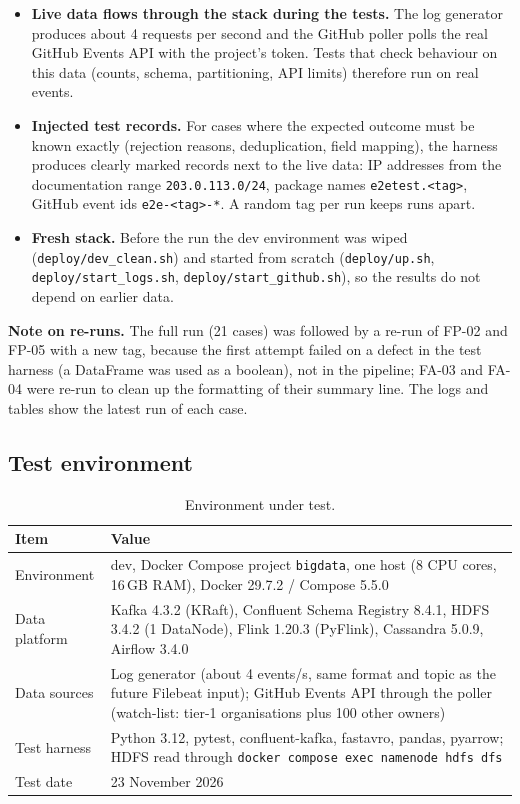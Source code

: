 \documentclass[11pt,a4paper]{article}
\begin{document}
\begin{itemize}
  \item \textbf{Live data flows through the stack during the tests.} The log generator produces about 4 requests per second and the GitHub poller
        polls the real GitHub Events API with the project's token. Tests that check behaviour on this data (counts, schema, partitioning, API limits)
        therefore run on real events.
  \item \textbf{Injected test records.} For cases where the expected outcome must be known exactly (rejection reasons, deduplication, field mapping),
        the harness produces clearly marked records next to the live data: IP addresses from the documentation range \texttt{203.0.113.0/24},
        package names \texttt{e2etest.<tag>}, GitHub event ids \texttt{e2e-<tag>-*}. A random tag per run keeps runs apart.
  \item \textbf{Fresh stack.} Before the run the dev environment was wiped (\texttt{deploy/dev\_clean.sh}) and started from scratch
        (\texttt{deploy/up.sh}, \texttt{deploy/start\_logs.sh}, \texttt{deploy/start\_github.sh}), so the results do not depend on earlier data.
\end{itemize}

\textbf{Note on re-runs.} The full run (21 cases) was followed by a re-run of FP-02 and FP-05 with a new tag, because the first attempt failed on a defect
in the test harness (a DataFrame was used as a boolean), not in the pipeline; FA-03 and FA-04 were re-run to clean up the formatting of their summary line.
The logs and tables show the latest run of each case.

\subsection{Test environment}

\begin{table}[H]
\centering
\caption{Environment under test.}
\small
\begin{tabularx}{\textwidth}{@{}L{4.2cm}Y@{}}
\toprule
\textbf{Item} & \textbf{Value} \\
\midrule
Environment & dev, Docker Compose project \texttt{bigdata}, one host (8 CPU cores, 16\,GB RAM), Docker 29.7.2 / Compose 5.5.0 \\
Data platform & Kafka 4.3.2 (KRaft), Confluent Schema Registry 8.4.1, HDFS 3.4.2 (1 DataNode), Flink 1.20.3 (PyFlink), Cassandra 5.0.9, Airflow 3.4.0 \\
Data sources & Log generator (about 4 events/s, same format and topic as the future Filebeat input); GitHub Events API through the poller (watch-list: tier-1 organisations plus 100 other owners) \\
Test harness & Python 3.12, pytest, confluent-kafka, fastavro, pandas, pyarrow; HDFS read through \texttt{docker compose exec namenode hdfs dfs} \\
Test date & 23 November 2026 \\
\bottomrule
\end{tabularx}
\end{table}
\end{document}
